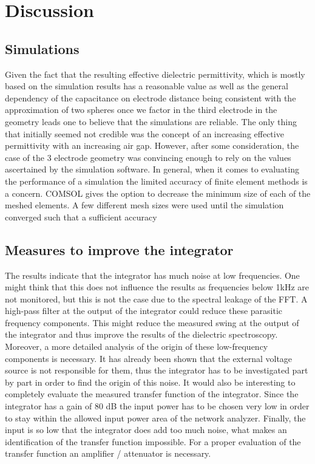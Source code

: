 \chapter{Discussion}

\section{Simulations}
Given the fact that the resulting effective dielectric permittivity, which
is mostly based on the simulation results has 
a reasonable value as well as the general dependency of the capacitance on electrode distance being consistent
with the approximation of two spheres once we factor in the third electrode in the geometry leads one 
to believe that the simulations are reliable. 
\newline
The only thing that initially seemed not credible was the concept of an increasing effective permittivity
with an increasing air gap. However, after some consideration, the case of the 3 electrode geometry was convincing enough to rely
on the values ascertained by the simulation software. 
\newline
In general, when it comes to evaluating the performance of a simulation the limited accuracy
of finite element methods is a concern. COMSOL gives the option to decrease the minimum size of each of the meshed elements.
A few different mesh sizes were used until the simulation converged such that a sufficient accuracy
\section{Measures to improve the integrator}
The results indicate that the integrator has much noise at low frequencies. One might think that this does not influence the results as frequencies below 1kHz are not monitored, but this is not the case due to the spectral leakage of the FFT.  A high-pass filter at the output of the integrator could reduce these parasitic frequency components. This might reduce the measured swing at the output of the integrator and thus improve the results of the dielectric spectroscopy. 
Moreover, a more detailed analysis of the origin of these low-frequency components is necessary. It has already been shown that the external voltage source is not responsible for them, thus the integrator has to be investigated part by part in order to find the origin of this noise. 
It would also be interesting to completely evaluate the measured transfer function of the integrator. Since the integrator has a gain of 80 dB the input power has to be chosen very low in order to stay within the allowed input power area of the network analyzer. Finally, the input is so low that the integrator does add too much noise, what makes an identification of the transfer function impossible. For a proper evaluation of the transfer function an amplifier / attenuator is necessary. 

